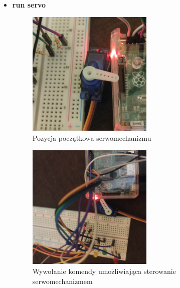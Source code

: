 \begin{itemize}
\newpage
\item \textbf{run servo}
	\begin{figure}[htbp]
	\centering
	\includegraphics[width=0.4\linewidth, height=6cm]{"obrazy/servo1.jpg"}
	\caption{Pozycja początkowa serwomechanizmu}
	\label{fig:55}
\end{figure}
\begin{figure}[htbp]
	\centering
	\includegraphics[width=0.4\linewidth, height=6cm]{"obrazy/servo2.jpg"}
	\caption{Wywołanie komendy umożliwiająca sterowanie serwomechanizmem }
	\label{fig:56}
\end{figure}
\\
\end{itemize}










